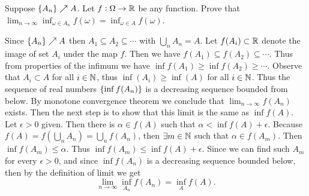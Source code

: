 \begin{problem}
	Suppose $ \{A_n\}\nearrow A $. Let $ f:\Omega\to \mathbb{R} $ be any function. Prove that $ \lim_{n\to\infty}\inf_{\omega\in A_n} f(\omega) = \inf_{\omega\in A}f(\omega) $.
\end{problem}
\begin{solution}
	Since $ \{A_n\}\nearrow A $ then $ A_1\subseteq A_2\subseteq \cdots $ with $ \bigcup_n A_n = A $. Let $ f(A_i) \subset \mathbb{R} $ denote the image of set $ A_i $ under the map $ f $. Then we have $ f(A_1)\subseteq f(A_2) \subseteq \cdots  $. Thus from properties of the infimum we have $ \inf f(A_1) \geq \inf f(A_2) \geq \cdots $. Observe that $ A_i \subset A $ for all $ i\in \mathbb{N} $, thus $ \inf(A_i)\geq \inf(A) $ for all $ i\in \mathbb{N} $. Thus the sequence of real numbers $ \{\inf f(A_n)\} $ is a decreasing sequence bounded from below. By monotone convergence theorem we conclude that $ \lim_{n\to\infty}f(A_n) $ exists. Then the next step is to show that this limit is the same as $ \inf f(A) $. Let $ \epsilon>0 $ given. Then there is $ \alpha\in f(A) $ such that $ \alpha < \inf f(A) + \epsilon $. Because $ f(A) = f(\bigcup_n A_n) = \bigcup_n f(A_n) $, then $ \exists m \in \mathbb{N} $ such that $ \alpha \in f(A_m) $. Then $ \inf f(A_m) \leq \alpha $. Thus $ \inf f(A_m) \leq \inf f(A) + \epsilon  $. Since we can find such $ A_m $ for every $ \epsilon>0 $, and since $ \inf f(A_n) $ is a decreasing sequence bounded below, then by the definition of limit we get
	\[ \lim_{n\to\infty} \inf_{A_n} f(A_n) = \inf_A f(A).  \]
\end{solution}

